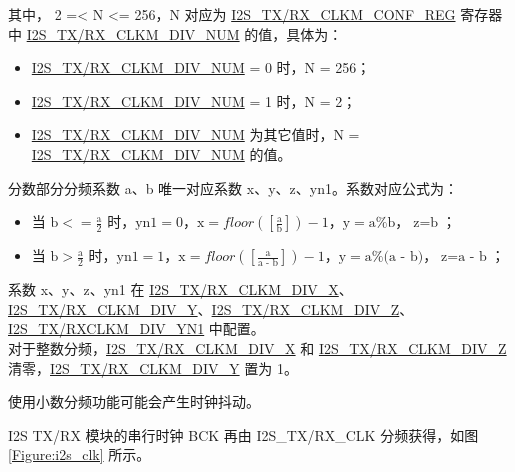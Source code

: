 \documentclass[main\_\_CN.tex]{subfiles}
\begin{document}
其中， 2 =< N <= 256，N 对应为 \hyperref[regdesc:I2STXCLKMCONFREG]{I2S\_TX/RX\_CLKM\_CONF\_REG} 寄存器中 \hyperref[fielddesc:I2STXCLKMDIVNUM]{I2S\_TX/RX\_CLKM\_DIV\_NUM} 的值，具体为：

\begin{itemize}
    \item \hyperref[fielddesc:I2STXCLKMDIVNUM]{I2S\_TX/RX\_CLKM\_DIV\_NUM} = 0 时，N = 256；
    \item \hyperref[fielddesc:I2STXCLKMDIVNUM]{I2S\_TX/RX\_CLKM\_DIV\_NUM} = 1 时，N = 2；
    \item \hyperref[fielddesc:I2STXCLKMDIVNUM]{I2S\_TX/RX\_CLKM\_DIV\_NUM} 为其它值时，N = \hyperref[fielddesc:I2STXCLKMDIVNUM]{I2S\_TX/RX\_CLKM\_DIV\_NUM} 的值。

\end{itemize}

分数部分分频系数 a、b 唯一对应系数 x、y、z、yn1。系数对应公式为：
\begin{itemize}
    \item 当 $\textrm{b} <= \frac{\textrm{a}}{2}$ 时，$\textrm{yn1} = 0$，$\textrm{x} = floor([\frac{\textrm{a}}{\textrm{b}}]) - 1$，$\textrm{y} = \textrm{a}\%\textrm{b}$，$\textrm{z} = \textrm{b}$；
    \item 当 $\textrm{b} > \frac{\textrm{a}}{2}$ 时，$\textrm{yn1}=1$，$\textrm{x} = floor([\frac{\textrm{a}}{\textrm{a - b}}]) - 1$，$\textrm{y} = \textrm{a}\%\textrm{(a - b)}$，$\textrm{z}=\textrm{a - b}$；
\end{itemize}

系数 x、y、z、yn1 在 \hyperref[fielddesc:I2STXCLKMDIVX]{I2S\_TX/RX\_CLKM\_DIV\_X}、\hyperref[fielddesc:I2STXCLKMDIVY]{I2S\_TX/RX\_CLKM\_DIV\_Y}、\hyperref[fielddesc:I2STXCLKMDIVZ]{I2S\_TX/RX\_CLKM\_DIV\_Z}、\hyperref[fielddesc:I2STXCLKMDIVYN1]{I2S\_TX/RXCLKM\_DIV\_YN1} 中配置。 \\
对于整数分频，\hyperref[fielddesc:I2STXCLKMDIVX]{I2S\_TX/RX\_CLKM\_DIV\_X} 和 \hyperref[fielddesc:I2STXCLKMDIVZ]{I2S\_TX/RX\_CLKM\_DIV\_Z} 清零，\hyperref[fielddesc:I2STXCLKMDIVY]{I2S\_TX/RX\_CLKM\_DIV\_Y} 置为 1。

\begin{tiplisting}
使用小数分频功能可能会产生时钟抖动。
\end{tiplisting}

I2S TX/RX 模块的串行时钟 BCK 再由 I2S\_TX/RX\_CLK 分频获得，如图 \ref{Figure:i2s_clk} 所示。
\end{document}
